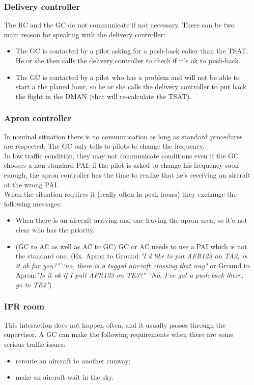 \documentclass{article}
\begin{document}
\subsubsection*{Delivery controller}
The RC and the GC do not communicate if not necessary. There can be two main reason for speaking with the delivery controller:
\begin{itemize} 
	\item The GC is contacted by a pilot asking for a push-back ealier than the TSAT. He or she then calls the delivery controller to check if it's ok to push-back. 
	\item The GC is contacted by a pilot who has a problem and will not be able to start a the planed hour, so he or she calls the delivery controller to put back the flight in the DMAN (that will re-calculate the TSAT).
\end{itemize}
\subsubsection*{Apron controller}
In nominal situation there is no communication as long as standard procedures are respected. The GC only tells to pilots to change the frequency.
\\
In low traffic condition, they may not communicate conditions even if the GC chooses a non-standard PAI: if the pilot is asked to change his frequency soon enough, the apron controller has the time to realize that he's receiving an aircraft at the wrong PAI.
\\
When the situation requires it (really often in peak hours) they exchange the following messages:

\begin{itemize}
	\item When there is an aircraft arriving and one leaving the apron area, so it's not clear who has the priority.
	\item (GC to AC as well as AC to GC) GC or AC needs to use a PAI which is not the standard one. (Ex. Apron to Ground:\textit{"I'd like to put AFR123 on TA2, is it ok for you?"``no, there is a tugged aircraft crossing that way"} or Ground to Apron:\textit{"\textit{Is it ok if I pull AFR123 on TE3}?"``No, I've got a push back there, go to TE2"})
\end{itemize}


\subsubsection*{IFR room}
This interaction does not happen often, and it usually passes through the supervisor. A GC can make the following requirements when there are some serious traffic issues:
\begin{itemize}
	\item reroute an aircraft to another runway;
	\item make an aircraft wait in the sky.
\end{itemize}
\end{document}
